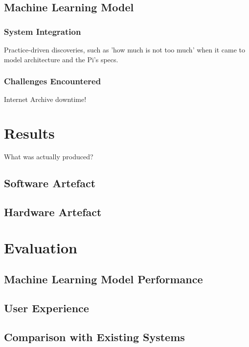       \subsection{Machine Learning Model}
          \subsubsection{System Integration}
              Practice-driven discoveries, such as 'how much is not too much' when it came to model architecture and the Pi's specs.
  
          \subsubsection{Challenges Encountered}
              Internet Archive downtime!
  
  
  \section{Results} %
      What was actually produced?
      \subsection{Software Artefact}
  
      \subsection{Hardware Artefact}
  
  \section{Evaluation}
      \subsection{Machine Learning Model Performance}
  
      \subsection{User Experience}
  
      \subsection{Comparison with Existing Systems}
  
